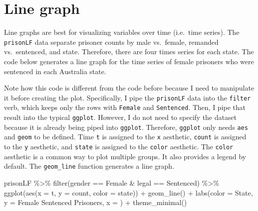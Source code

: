 \documentclass[
]{book}
\makeatletter
\newenvironment{Shaded}{\begin{snugshade}}{\end{snugshade}}
\newcommand{\AttributeTok}[1]{\textcolor[rgb]{0.61,0.61,0.61}{#1}}
\newcommand{\FunctionTok}[1]{\textcolor[rgb]{0,0,0}{#1}}
\newcommand{\NormalTok}[1]{#1}
\newcommand{\SpecialCharTok}[1]{\textcolor[rgb]{0,0,0}{#1}}
\newcommand{\StringTok}[1]{\textcolor[rgb]{0.5,0.5,0.5}{#1}}
\newenvironment{kframe}{%
\medskip{}
\setlength{\fboxsep}{.8em}
 \def\at@end@of@kframe{}%
 \ifinner\ifhmode%
  \def\at@end@of@kframe{\end{minipage}}%
  \begin{minipage}{\columnwidth}%
 \fi\fi%
 \def\FrameCommand##1{\hskip\@totalleftmargin \hskip-\fboxsep
 \colorbox{shadecolor}{##1}\hskip-\fboxsep
     \hskip-\linewidth \hskip-\@totalleftmargin \hskip\columnwidth}%
 \MakeFramed {\advance\hsize-\width
   \@totalleftmargin\z@ \linewidth\hsize
   \@setminipage}}%
 {\par\unskip\endMakeFramed%
 \at@end@of@kframe}
\renewenvironment{Shaded}{\begin{kframe}}{\end{kframe}}
\makeatother
\begin{document}
\hypertarget{line-graph}{%
\section{Line graph}\label{line-graph}}

Line graphs are best for visualizing variables over time (i.e.~time series). The \texttt{prisonLF} data separate prisoner counts by male vs.~female, remanded vs.~sentenced, and state. Therefore, there are four times series for each state. The code below generates a line graph for the time series of female prisoners who were sentenced in each Australia state.

Note how this code is different from the code before because I need to manipulate it before creating the plot. Specifically, I pipe the \texttt{prisonLF} data into the \texttt{filter} verb, which keeps only the rows with \texttt{Female} and \texttt{Sentenced}. Then, I pipe that result into the typical \texttt{ggplot}. However, I do not need to specify the dataset because it is already being piped into \texttt{ggplot}. Therefore, \texttt{ggplot} only needs \texttt{aes} and \texttt{geom} to be defined. Time \texttt{t} is assigned to the \texttt{x} aesthetic, \texttt{count} is assigned to the \texttt{y} aesthetic, and \texttt{state} is assigned to the \texttt{color} aesthetic. The \texttt{color} aesthetic is a common way to plot multiple groups. It also provides a legend by default. The \texttt{geom\_line} function generates a line graph.

\begin{Shaded}
\begin{Highlighting}[]
\NormalTok{prisonLF }\SpecialCharTok{\%\textgreater{}\%} 
  \FunctionTok{filter}\NormalTok{(gender }\SpecialCharTok{==} \StringTok{\textquotesingle{}Female\textquotesingle{}} \SpecialCharTok{\&}\NormalTok{ legal }\SpecialCharTok{==} \StringTok{\textquotesingle{}Sentenced\textquotesingle{}}\NormalTok{) }\SpecialCharTok{\%\textgreater{}\%} 
  \FunctionTok{ggplot}\NormalTok{(}\FunctionTok{aes}\NormalTok{(}\AttributeTok{x =}\NormalTok{ t, }\AttributeTok{y =}\NormalTok{ count, }\AttributeTok{color =}\NormalTok{ state)) }\SpecialCharTok{+}
  \FunctionTok{geom\_line}\NormalTok{() }\SpecialCharTok{+}
  \FunctionTok{labs}\NormalTok{(}\AttributeTok{color =} \StringTok{\textquotesingle{}State\textquotesingle{}}\NormalTok{, }\AttributeTok{y =} \StringTok{\textquotesingle{}Female Sentenced Prisoners\textquotesingle{}}\NormalTok{, }\AttributeTok{x =} \StringTok{\textquotesingle{}\textquotesingle{}}\NormalTok{) }\SpecialCharTok{+}
  \FunctionTok{theme\_minimal}\NormalTok{()}
\end{Highlighting}
\end{Shaded}
\end{document}
